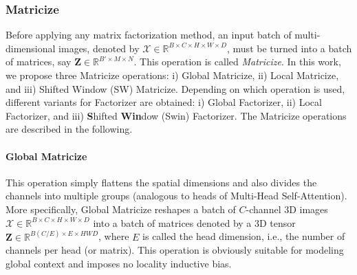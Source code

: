 \documentclass[a4,12pt]{article}
\begin{document}
	
	\subsubsection{Matricize} \label{sec: matricize}
	
	Before applying any matrix factorization method, an input batch of multi-dimensional images, denoted by $ \bm{\mathcal{X}} \in \mathbb{R}^{B \times C \times H \times W \times D} $, must be turned into a batch of matrices, say $ \mathbf{Z} \in \mathbb{R}^{B' \times M \times N} $. This operation is called \textit{Matricize}. In this work, we propose three Matricize operations: i) Global Matricize, ii) Local Matricize, and iii) Shifted Window (SW) Matricize. Depending on which operation is used, different variants for Factorizer are obtained: i) Global Factorizer, ii) Local Factorizer, and iii) \textbf{S}hifted \textbf{Win}dow (Swin) Factorizer. The Matricize operations are described in the following.
	
	\paragraph{Global Matricize}
	This operation simply flattens the spatial dimensions and also divides the channels into multiple groups (analogous to heads of Multi-Head Self-Attention). More specifically, Global Matricize reshapes a batch of $ C $-channel 3D images $ \bm{\mathcal{X}} \in \mathbb{R}^{B \times C \times H \times W \times D} $ into a batch of matrices denoted by a 3D tensor $ \mathbf{Z} \in \mathbb{R}^{B(C/E) \times E \times HWD} $, where $ E $ is called the head dimension, i.e., the number of channels per head (or matrix). This operation is obviously suitable for modeling global context and imposes no locality inductive bias.
	
\end{document}
